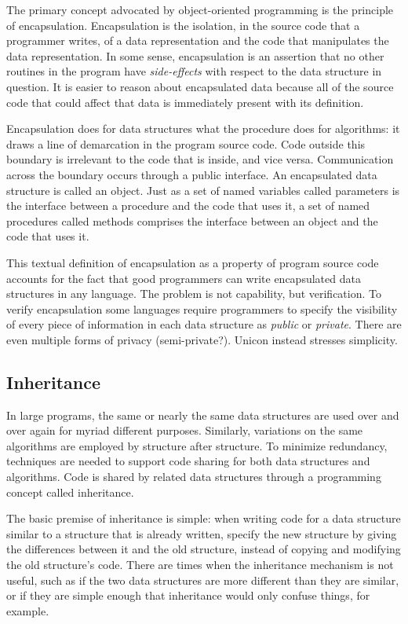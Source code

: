 The primary concept advocated by object-oriented programming is the
principle of encapsulation. Encapsulation is the
isolation, in the source code that a programmer writes, of a data
representation and the code that manipulates the data representation.
In some sense, encapsulation is an assertion that no other routines in
the program have {\em side-effects\/} with
respect to the data structure in question. It is easier to reason about
encapsulated data because all of the source code that could affect that
data is immediately present with its definition. 

Encapsulation does for data structures what the procedure does for
algorithms: it draws a line of demarcation in the program source code.
Code outside this boundary is irrelevant to
the code that is inside, and vice versa. Communication across the
boundary occurs through a public interface. An encapsulated
data structure is called an object. Just as a set of named variables called
parameters is the interface between a procedure and the
code that uses it, a set of named procedures called methods comprises
the interface between an object and the code that uses it. 

This textual definition of encapsulation as a property of program source
code accounts for the fact that good programmers can write encapsulated
data structures in any language. The problem is not capability, but
verification. To verify encapsulation some languages require
programmers to specify the visibility of every piece of information in
each data structure as {\em public\/} or
{\em private\/}. There are even multiple forms of
privacy (semi-private?). Unicon instead stresses simplicity. 

\subsection*{Inheritance}

In large programs, the same or nearly the same data structures are used
over and over again for myriad different purposes. Similarly,
variations on the same algorithms are employed by structure after
structure. To minimize redundancy, techniques are needed to support
code sharing for both data structures and algorithms. Code is shared by
related data structures through a programming concept called
inheritance. 

The basic premise of inheritance is simple: when writing code for a data
structure similar to a structure that is already written,
specify the new structure by giving the differences between it and
the old structure, instead of copying and modifying the old
structure's code. There are times when the
inheritance mechanism is not useful, such as if the two data structures
are more different than they are similar, or if they are simple enough
that inheritance would only confuse things, for example. 

